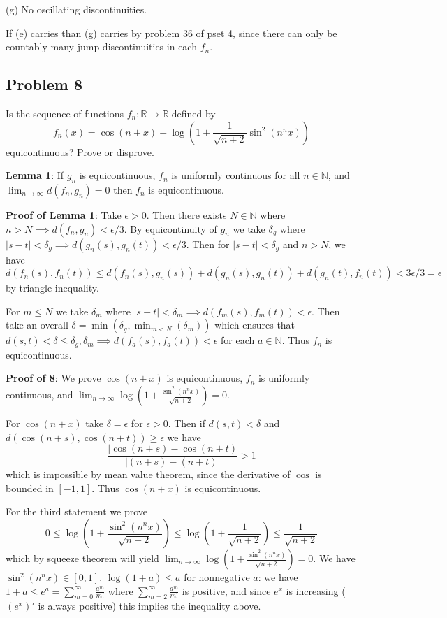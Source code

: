 \documentclass{amsart}
\begin{document}
\bigskip

(g) No oscillating discontinuities.

\medskip \noindent If (e) carries than (g) carries by problem 36 of pset 4, since there can only be countably many jump discontinuities in each
$f_n$.

\newpage

\subsection*{Problem 8} Is the sequence of functions \( f_n : \mathbb{R} \to \mathbb{R} \) defined by
    \[
    f_n(x) = \cos(n + x) + \log \left( 1 + \frac{1}{\sqrt{n + 2}} \sin^2(n^n x) \right)
    \]
equicontinuous? Prove or disprove.

\medskip \noindent \textbf{Lemma 1}: If $g_n$ is equicontinuous, $f_n$ is uniformly continuous for all $n\in \mathbb{N}$, and $\lim_{n\to \infty}d(f_n, g_n) = 0$
then $f_n$ is equicontinuous.

\medskip \noindent \textbf{Proof of Lemma 1}: Take $\epsilon>0$. Then there exists $N\in \mathbb{N}$ where $n>N\implies d(f_n, g_n)<\epsilon/3$. By
equicontinuity of $g_n$ we take $\delta_g$ where $|s-t|<\delta_g\implies d(g_n(s), g_n(t))<\epsilon/3$. Then for $|s-t|<\delta_g$
and $n>N$, we have \[d(f_n(s), f_n(t))\leq d(f_n(s), g_n(s))+d(g_n(s), g_n(t))+d(g_n(t), f_n(t))<3\epsilon/3=\epsilon\] by triangle inequality.

\medskip \noindent For $m\leq N$ we take $\delta_m$ where
$|s-t|<\delta_m\implies d(f_m(s), f_m(t))<\epsilon$. Then take an overall $\delta = \min(\delta_g, \min_{m<N}(\delta_m))$ which
ensures that $d(s,t)<\delta\leq \delta_g, \delta_m\implies d(f_a(s), f_a(t))<\epsilon$ for each $a\in\mathbb{N}$. Thus $f_n$ is equicontinuous.

\medskip \noindent \textbf{Proof of 8}: We prove $\cos(n+x)$ is equicontinuous, $f_n$ is uniformly continuous, and 
$\lim_{n\to\infty}\log(1+\frac{\sin^2(n^nx)}{\sqrt{n+2}})=0$.

\medskip \noindent For $\cos(n+x)$ take $\delta=\epsilon$ for $\epsilon>0$. Then if $d(s, t)<\delta$ and 
$d(\cos(n+s),\cos(n+t))\geq\epsilon$ we have \[\frac{|\cos(n+s)-\cos(n+t)}{|(n+s)-(n+t)|}>1\] which is impossible
by mean value theorem, since the derivative of $\cos$ is bounded in $[-1, 1]$. Thus $\cos(n+x)$ is equicontinuous.

\medskip \noindent For the third statement we prove \[0\leq\log \left( 1+\frac{\sin^2(n^nx)}{\sqrt{n+2}} \right)\leq \log \left( 1+\frac{1}{\sqrt{n+2}} \right) \leq \frac{1}{\sqrt{n+2}}\]
which by squeeze theorem will yield $\lim_{n\to\infty}\log(1+\frac{\sin^2(n^nx)}{\sqrt{n+2}})=0$. We have $\sin^2(n^nx)\in [0,1]$. $\log(1+a)\leq a$ for
nonnegative $a$: we have $1+a\leq e^a=\sum_{m=0}^{\infty}\frac{a^m}{m!}$ where $\sum_{m=2}^{\infty}\frac{a^m}{m!}$ is positive,
and since $e^x$ is increasing ($(e^x)'$ is always positive) this implies the inequality above.
\end{document}
